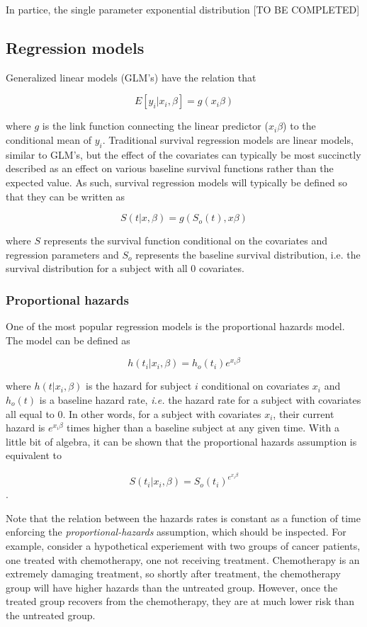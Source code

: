 \documentclass[a4paper]{article}
\begin{document}
  In partice, the single parameter exponential distribution [TO BE COMPLETED]

  \subsection{Regression models}
  
  Generalized linear models (GLM's) have the relation that 
  
  \[
  E[y_i | x_i, \beta] = g(x_i \beta)
  \]
  
  where $g$ is the link function connecting the linear predictor ($x_i \beta$) to the conditional mean of $y_i$. Traditional survival regression models are linear models, similar to GLM's, but the effect of the covariates can typically be most succinctly  described as an effect on various baseline survival functions rather than the expected value. As such, survival regression models will typically be defined so that they can be written as 
  
  \[
  S(t | x, \beta) = g(S_o(t), x \beta ) 
  \]
  
  where $S$ represents the survival function conditional on the covariates and regression parameters and $S_o$ represents the baseline survival distribution, i.e. the survival distribution for a subject with all 0 covariates. 
  
    \subsubsection{Proportional hazards}
    
    One of the most popular regression models is the proportional hazards model. The model can be defined as
    
    \[
    h(t_i|x_i, \beta) = h_o(t_i) e^{x_i \beta}
    \]
    
    where $h(t|x_i, \beta)$ is the hazard for subject $i$ conditional on covariates $x_i$ and $h_o(t)$ is a baseline hazard rate, \emph{i.e.} the hazard rate for a subject with covariates all equal to 0. In other words, for a subject with covariates $x_i$, their current hazard is $e^{x_i \beta}$ times higher than a baseline subject at any given time. With a little bit of algebra, it can be shown that the proportional hazards assumption is equivalent to 
  
\[
  S(t_i| x_i, \beta) = S_o(t_i)^{e^{x_i \beta}}
\].

    
    Note that the relation between the hazards rates is constant as a function of time enforcing the \emph{proportional-hazards} assumption, which should be inspected.  For example, consider a hypothetical experiement with two groups of cancer patients, one treated with chemotherapy, one not receiving treatment. Chemotherapy is an extremely damaging treatment, so shortly after treatment, the chemotherapy group will have higher hazards than the untreated group. However, once the treated group recovers from the chemotherapy, they are at much lower risk than the untreated group. 
    
\end{document}

